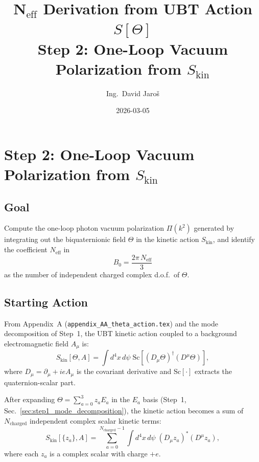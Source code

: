 \documentclass[11pt,a4paper]{article}
\title{N$_{\mathrm{eff}}$ Derivation from UBT Action $S[\Theta]$\\
    \large Step 2: One-Loop Vacuum Polarization from $S_{\mathrm{kin}}$}
\author{Ing.\ David Jaroš}
\date{2026-03-05}
\newcommand{\Sc}{\mathrm{Sc}}
\theoremstyle{remark}
\begin{document}
  \maketitle
\fi

\section{Step 2: One-Loop Vacuum Polarization from $S_{\mathrm{kin}}$}
\label{sec:step2_vacuum_polarization}

\subsection{Goal}

Compute the one-loop photon vacuum polarization $\Pi(k^2)$ generated by integrating out the
biquaternionic field $\Theta$ in the kinetic action $S_{\mathrm{kin}}$, and identify the
coefficient $N_{\mathrm{eff}}$ in
\begin{equation}
  B_0 = \frac{2\pi\,N_{\mathrm{eff}}}{3}
  \label{eq:B0_Neff}
\end{equation}
as the number of independent charged complex d.o.f.\ of $\Theta$.

\subsection{Starting Action}

From Appendix~A (\texttt{appendix\_AA\_theta\_action.tex}) and the mode decomposition of
Step~1, the UBT kinetic action coupled to a background electromagnetic field $A_\mu$ is:
\begin{equation}
  S_{\mathrm{kin}}[\Theta, A]
  = \int d^4x\,d\psi\;\Sc\!\left[(D_\mu\Theta)^\dagger(D^\mu\Theta)\right],
  \label{eq:Skin_UBT}
\end{equation}
where $D_\mu = \partial_\mu + ie A_\mu$ is the covariant derivative and $\Sc[\cdot]$
extracts the quaternion-scalar part.

After expanding $\Theta = \sum_{a=0}^{3} z_a E_a$ in the $E_a$ basis (Step~1,
Sec.~\ref{sec:step1_mode_decomposition}), the kinetic action becomes a sum of
$N_{\mathrm{charged}}$ independent complex scalar kinetic terms:
\begin{equation}
  S_{\mathrm{kin}}[\{z_a\}, A]
  = \sum_{a=0}^{N_{\mathrm{charged}}-1}
    \int d^4x\,d\psi\;(D_\mu z_a)^*(D^\mu z_a),
  \label{eq:Skin_sum}
\end{equation}
where each $z_a$ is a complex scalar with charge $+e$.
\end{document}
